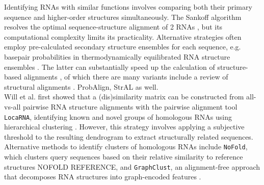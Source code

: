 \documentclass[a4paper,11pt]{article}
\newcommand\dotaligner{\texttt{DotAligner}}
\newcommand\graphclust{\texttt{GraphClust}}
\newcommand\locarna{\texttt{LocaRNA}}
\newcommand\carna{\texttt{CARNA}}
\begin{document}
Identifying RNAs with similar functions involves comparing both their primary sequence 
and higher-order structures simultaneously. The Sankoff algorithm resolves
the optimal sequence-structure alignment of 2 RNAs \cite{sankoff85}, 
but its computational complexity limits its practicality. Alternative strategies often 
employ pre-calculated secondary structure ensembles for each sequence, e.g. basepair
probabilities in thermodynamically equilibrated RNA structure ensembles
\cite{McCaskill:1990}. The latter can substantially speed up the calculation
of structure-based alignments \cite{Hofacker15073017}, of which there are many variants {\color{red} include a review of structural alignments }. 
{\color{red}ProbAlign, StrAL as well}. \\

Will et al. first showed that a (dis)similarity matrix can be constructed from all-vs-all pairwise RNA structure alignments with  the pairwise alignment tool \locarna{}, identifying known and novel groups of homologous RNAs using hierarchical clustering \cite{Will17432929}. However, this strategy involves applying a subjective threshold to the resulting dendrogram to extract structurally related sequences. Alternative methods to identify clusters of homologous RNAs include \texttt{NoFold}, which clusters query sequences based on their relative similarity to reference structures {\color{red} NOFOLD REFERENCE}, and \graphclust{}, an alignment-free approach that decomposes RNA structures into graph-encoded features \cite{Heyne22689765}.\\


\end{document}
